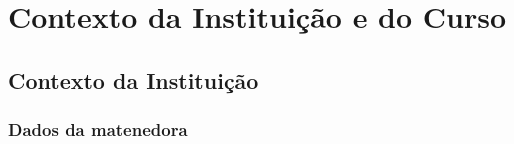 \newpage
\section{Contexto da Institui\c{c}\~ao e do Curso}

\subsection{Contexto da Institui\c{c}\~ao}

\subsubsection{Dados da matenedora}

